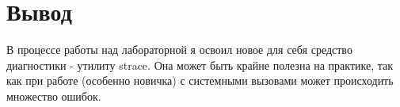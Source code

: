 \section{Вывод}

В процессе работы над лабораторной я освоил новое для себя средство диагностики - утилиту strace. Она может быть крайне полезна на практике, так как при работе (особенно новичка) с системными вызовами может происходить множество ошибок.

